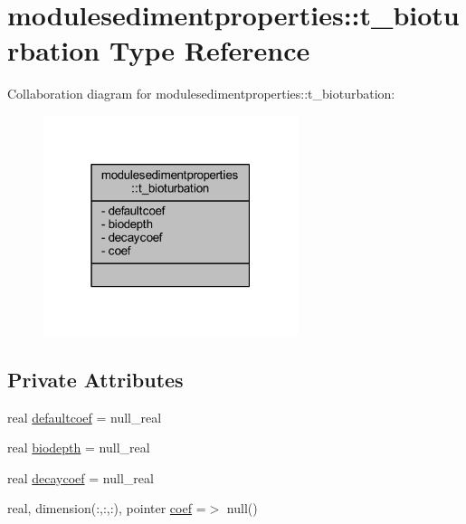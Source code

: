 \hypertarget{structmodulesedimentproperties_1_1t__bioturbation}{}\section{modulesedimentproperties\+:\+:t\+\_\+bioturbation Type Reference}
\label{structmodulesedimentproperties_1_1t__bioturbation}


Collaboration diagram for modulesedimentproperties\+:\+:t\+\_\+bioturbation\+:\nopagebreak
\begin{figure}[H]
\begin{center}
\leavevmode
\includegraphics[width=211pt]{structmodulesedimentproperties_1_1t__bioturbation__coll__graph}
\end{center}
\end{figure}
\subsection*{Private Attributes}
\begin{DoxyCompactItemize}
\item 
real \mbox{\hyperlink{structmodulesedimentproperties_1_1t__bioturbation_a08f9261f05b0e9ba1919884f135b78d1}{defaultcoef}} = null\+\_\+real
\item 
real \mbox{\hyperlink{structmodulesedimentproperties_1_1t__bioturbation_a23efb9f57f3241fb0488ae80dda13ec2}{biodepth}} = null\+\_\+real
\item 
real \mbox{\hyperlink{structmodulesedimentproperties_1_1t__bioturbation_a6e70a99127d91eab0e4ec2901b87c76b}{decaycoef}} = null\+\_\+real
\item 
real, dimension(\+:,\+:,\+:), pointer \mbox{\hyperlink{structmodulesedimentproperties_1_1t__bioturbation_a7340b3cf9674e6ab64e4722879c8a27b}{coef}} =$>$ null()
\end{DoxyCompactItemize}


